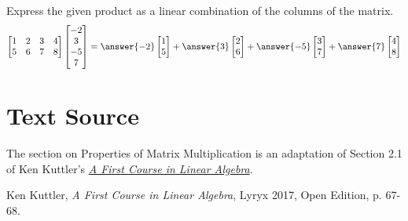 \documentclass{ximera}
\begin{document}
\begin{problem}
Express the given product as a linear combination of the columns of the matrix.
$$\begin{bmatrix}1&2&3&4\\5&6&7&8\end{bmatrix}\begin{bmatrix}-2\\3\\-5\\7\end{bmatrix}=\answer{-2}\begin{bmatrix}1\\5\end{bmatrix}+\answer{3}\begin{bmatrix}2\\6\end{bmatrix}+\answer{-5}\begin{bmatrix}3\\7\end{bmatrix}+\answer{7}\begin{bmatrix}4\\8\end{bmatrix}$$
\end{problem}

\section*{Text Source}
The section on Properties of Matrix Multiplication is an adaptation of Section 2.1 of Ken Kuttler's \href{https://open.umn.edu/opentextbooks/textbooks/a-first-course-in-linear-algebra-2017}{\it A First Course in Linear Algebra}.

Ken Kuttler, {\it  A First Course in Linear Algebra}, Lyryx 2017, Open Edition, p. 67-68.
\end{document}
